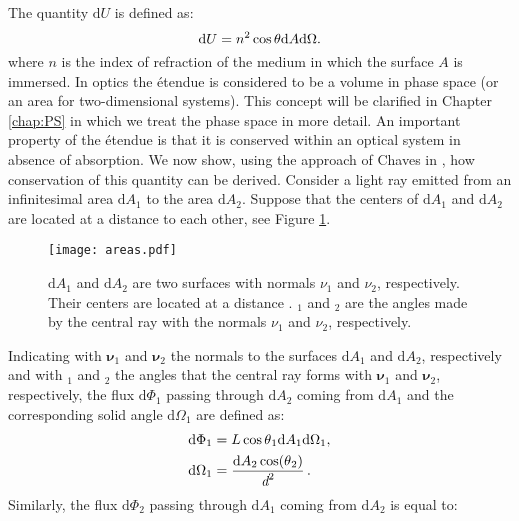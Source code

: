 The quantity $ \textrm{d}U $ is defined as:
\begin{equation}\label{etendue}
\textrm{d}U = n^2 \cos\mbox{$\theta$}\textrm{d}A\textrm{d}\Omega.
\end{equation}
where $n$ is the index of refraction of the medium in which the surface $A$ is immersed. In optics the \'{e}tendue is considered to be a volume in phase space  (or an area for two-dimensional systems). This concept will be clarified in Chapter \ref{chap:PS} in which we treat the phase space in more detail.
An important property of the \'{e}tendue is that it is conserved within an optical system in absence of absorption. We now show, using the approach of Chaves in \cite{chaves2015introduction}, 
how conservation of this quantity can be derived.
Consider a light ray emitted from an infinitesimal area $\textrm{d}A_1$ to the area $\textrm{d}A_2$. Suppose that the centers of $\textrm{d}A_1$ and $\textrm{d}A_2$ 
are located at a distance  to each other,  see Figure \ref{fig:etendue_conservation}.
\begin{figure}[h]
 \label{fig:etendue_conservation}
     \begin{center}
     \texttt{[image: areas.pdf]}
     \end{center}
     \caption{$\textrm{d}A_1$ and $\textrm{d}A_2$ are two surfaces with normals $\nu_1$ and $\nu_2$, respectively. Their centers are located at a distance .
\myangle$_1$ and \myangle$_2$ are the angles made by the central ray with the normals $\nu_1$ and $\nu_2$, respectively.}
\label{fig:etendue_conservation}
 \end{figure}
Indicating with $\boldsymbol{\nu}_1$ and $\boldsymbol{\nu}_2$ the normals to the surfaces $\textrm{d}A_1$ and $\textrm{d}A_2$, respectively and with \myangle$_1$ and \myangle$_2$ the angles that the central ray forms with $\boldsymbol{\nu}_1$ and $\boldsymbol{\nu}_2$, respectively,
the flux $\textrm{d}\Phi_1$ passing through $\textrm{d}A_2$ coming from $\textrm{d}A_1$ and the corresponding solid angle $\textrm{d}\Omega_1 $ are defined as:
\begin{equation}
\begin{split}
\textrm{d}\Phi_1 &= L \cos\mbox{$\theta$}_1 \textrm{d}A_1 \textrm{d}\Omega_1, \\
\textrm{d}\Omega_1 &= \frac{\textrm{d}A_2\cos(\mbox{$\theta$}_2)}{\textit{d}^2}\,.
\end{split}
\end{equation}
Similarly, the flux $\textrm{d}\Phi_2$ passing through $\textrm{d}A_1$ coming from $\textrm{d}A_2$ is equal to:
